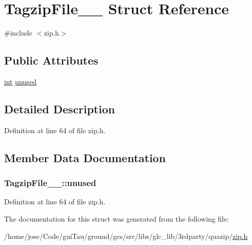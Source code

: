 \hypertarget{struct_tagzip_file____}{\section{Tagzip\-File\-\_\-\-\_\- Struct Reference}
\label{struct_tagzip_file____}
}


{\ttfamily \#include $<$zip.\-h$>$}

\subsection*{Public Attributes}
\begin{DoxyCompactItemize}
\item 
\hyperlink{ioapi_8h_a787fa3cf048117ba7123753c1e74fcd6}{int} \hyperlink{struct_tagzip_file_____a6a2fcb9cfe338b1f738f45549f84cd38}{unused}
\end{DoxyCompactItemize}


\subsection{Detailed Description}


Definition at line 64 of file zip.\-h.



\subsection{Member Data Documentation}
\hypertarget{struct_tagzip_file_____a6a2fcb9cfe338b1f738f45549f84cd38}{
\subsubsection[{unused}]{ Tagzip\-File\-\_\-\-\_\-\-::unused}}\label{struct_tagzip_file_____a6a2fcb9cfe338b1f738f45549f84cd38}


Definition at line 64 of file zip.\-h.



The documentation for this struct was generated from the following file\-:\begin{DoxyCompactItemize}
\item 
/home/jose/\-Code/gui\-Tau/ground/gcs/src/libs/glc\-\_\-lib/3rdparty/quazip/\hyperlink{zip_8h}{zip.\-h}\end{DoxyCompactItemize}
